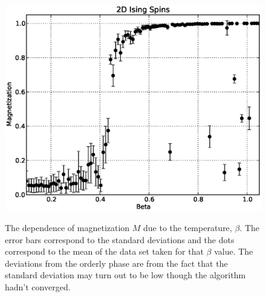 \begin{figure}[H]
\center
\includegraphics[width=\linewidth]{fig/20/ploterr.eps}
\label{fig:400spins}
\caption[The dependence of magnetization $ M $ due to the temperature, $ \beta $.]{The dependence of magnetization $ M $ due to the temperature, $ \beta $. The error bars correspond to the standard deviations and the dots correspond to the mean of the data set taken for that $ \beta $ value. The deviations from the orderly phase are from the fact that the standard deviation may turn out to be low though the algorithm hadn't converged.}
\end{figure}

